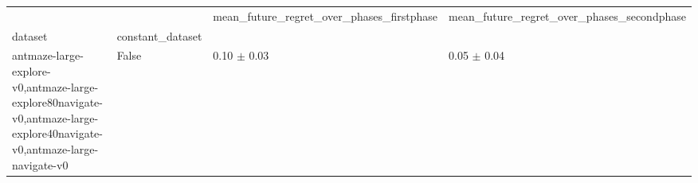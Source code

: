 \begin{tabular}{llll}
\toprule
 &  & mean_future_regret_over_phases_firstphase & mean_future_regret_over_phases_secondphase \\
dataset & constant_dataset &  &  \\
\midrule
antmaze-large-explore-v0,antmaze-large-explore80navigate-v0,antmaze-large-explore40navigate-v0,antmaze-large-navigate-v0 & False & 0.10 $\pm$ 0.03 & 0.05 $\pm$ 0.04 \\
\cline{1-4}
\bottomrule
\end{tabular}
